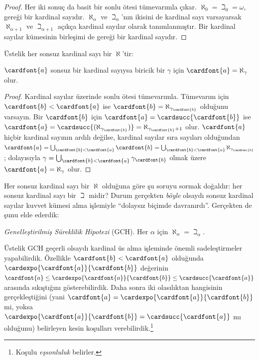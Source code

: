 \begin{proof}
Her iki sonuç da basit bir sonlu ötesi tümevarımla çıkar.
$\aleph_0=\beth_0=\omega$, 
gereği bir kardinal sayıdır. $\aleph_\alpha$ ve $\beth_\alpha$'nın
ikisini de kardinal sayı varsayarsak $\aleph_{\alpha+1}$ ve
$\beth_{\alpha+1}$ açıkça kardinal sayılar olarak tanımlanmıştır. Bir
kardinal sayılar kümesinin birleşimi de
 gereği bir kardinal
sayıdır.
\end{proof}
\noindent
Üstelik her sonsuz kardinal sayı bir $\aleph$'tir:

\begin{prop}
$\cardfont{a}$ sonsuz bir kardinal sayıysa biricik bir $\gamma$ için
$\cardfont{a}=\aleph_\gamma$ olur.
\end{prop}

\begin{proof}
Kardinal sayılar üzerinde sonlu ötesi tümevarımla. Tümevarım için
$\cardfont{b}<\cardfont{a}$ ise
$\cardfont{b}=\aleph_{\gamma_\cardfont{b}}$ olduğunu varsayın.
Bir $\cardfont{b}$ için
$\cardfont{a}=\cardsucc{\cardfont{b}}$ ise
$\cardfont{a}=\cardsucc{(\aleph_{\gamma_\cardfont{b}})}=
\aleph_{\gamma_\cardfont{b}+1}$ olur. $\cardfont{a}$ hiçbir kardinal
sayının ardılı değilse, kardinal sayılar sıra sayıları olduğundan
$\cardfont{a}=\bigcup_{\cardfont{b}<\cardfont{a}}\cardfont{b}=
\bigcup_{\cardfont{b}<\cardfont{a}}{\aleph_{\gamma_\cardfont{b}}}$;
dolayısıyla
$\gamma=\bigcup_{\cardfont{b}<\cardfont{a}}\gamma_\cardfont{b}$ olmak
üzere $\cardfont{a}=\aleph_\gamma$ olur.
\end{proof}

Her sonsuz kardinal sayı bir $\aleph$ olduğuna göre şu soruyu sormak
doğaldır: her sonsuz kardinal sayı bir $\beth$ midir? Durum gerçekten
\emph{böyle} olsaydı sonsuz kardinal sayılar kuvvet kümesi alma işlemiyle
``dolaysız biçimde davranırdı''. Gerçekten de şunu elde ederdik:

\begin{defish}
\emph{Genelleştirilmiş Süreklilik Hipotezi} (GCH).
Her $\alpha$ için $\aleph_\alpha=\beth_\alpha$.
\end{defish}

Üstelik GCH geçerli olsaydı kardinal üs alma işleminde önemli
sadeleştirmeler yapabilirdik. Özellikle $\cardfont{b}<\cardfont{a}$
olduğunda $\cardexpo{\cardfont{a}}{\cardfont{b}}$ değerinin
$\cardfont{a}\leq\cardexpo{\cardfont{a}}{\cardfont{b}}\leq
\cardsucc{\cardfont{a}}$ arasında sıkıştığını gösterebilirdik. Daha sonra
iki olasılıktan hangisinin gerçekleştiğini (yani
$\cardfont{a}=\cardexpo{\cardfont{a}}{\cardfont{b}}$ mi, yoksa
$\cardexpo{\cardfont{a}}{\cardfont{b}}=\cardsucc{\cardfont{a}}$ mı
olduğunu) belirleyen kesin koşulları verebilirdik.\footnote{Koşulu
\emph{eşsonluluk} belirler.}

